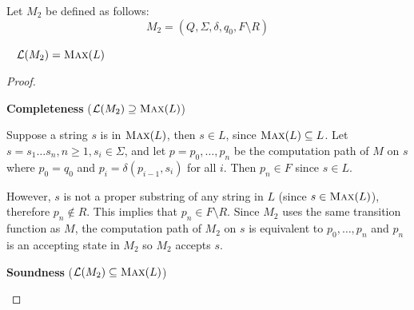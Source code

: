 \begin{problem}
\begin{Answer}
\begin{enumalph}
      \step
      Let $M_2$ be defined as follows:
      \[ M_2 = (Q, \Sigma, \delta, q_0, F \setminus R)\]
      \begin{claim}~\label{claim:Max}
        $\mathcal{L}(M_2) = \textsc{Max}(L)$
        \begin{proof}

          \step
          \begin{enumroman}
            \item \textbf{Completeness} ($\mathcal{L}(M_2) \supseteq \textsc{Max}(L)$)
            
            \step
            Suppose a string $s$ is in $\textsc{Max}(L)$,
            then $s \in L$, since $\textsc{Max}(L) \subseteq L$.
            Let $s = s_1 \ldots s_n, n \ge 1, s_i \in \Sigma$,
            and let $p = p_0, \ldots, p_n$ be the computation path of $M$ on $s$
            where $p_0 = q_0$ and $p_i = \delta(p_{i-1}, s_i)$ for all $i$.
            Then $p_n \in F$ since $s \in L$.
            
            \step
            However, $s$ is not a proper substring of any string in $L$
            (since $s \in \textsc{Max}(L)$), therefore $p_n \notin R$.
            This implies that $p_n \in F \setminus R$.
            Since $M_2$ uses the same transition function as $M$,
            the computation path of $M_2$ on $s$ is equivalent to $p_0, \ldots, p_n$
            and $p_n$ is an accepting state in $M_2$ so $M_2$ accepts $s$.
            \item \textbf{Soundness} ($\mathcal{L}(M_2) \subseteq \textsc{Max}(L)$)
              

\end{enumroman}
\end{proof}
\end{claim}
\end{enumalph}
\end{Answer}
\end{problem}
